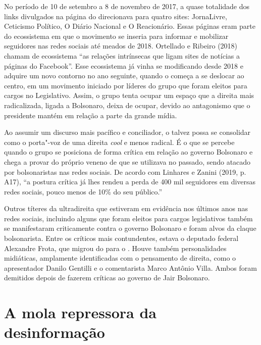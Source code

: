 No período de 10 de setembro a 8 de novembro de 2017, a quase totalidade
dos links divulgados na página do  direcionava para quatro sites:
JornaLivre, Ceticismo Político, O Diário Nacional e O Reacionário. Essas
páginas eram parte do ecossistema em que o movimento se inseria para
informar e mobilizar seguidores nas redes sociais até meados de 2018.
Ortellado e Ribeiro (2018) chamam de ecossistema ``as relações
intrínsecas que ligam sites de notícias a páginas do Facebook''. Esse
ecossistema já vinha se modificando desde 2018 e adquire um novo
contorno no ano seguinte, quando o  começa a se deslocar ao centro,
em um movimento iniciado por líderes do grupo que foram eleitos para
cargos no Legislativo. Assim, o grupo tenta ocupar um espaço que a
direita mais radicalizada, ligada a Bolsonaro, deixa de ocupar, devido
ao antagonismo que o presidente mantém em relação a parte da grande
mídia.

Ao assumir um discurso mais pacífico e conciliador, o  talvez possa
se consolidar como o porta"-voz de uma direita \emph{cool} e menos
radical. É o que se percebe quando o grupo se posiciona de forma crítica
em relação ao governo Bolsonaro e chega a provar do próprio veneno de
que se utilizava no passado, sendo atacado por bolsonaristas nas redes
sociais. De acordo com Linhares e Zanini (2019, p. A17), ``a postura
crítica já lhes rendeu a perda de 400 mil seguidores em diversas redes
sociais, pouco menos de 10\% do seu público.''

Outros títeres da ultradireita que estiveram em evidência nos últimos
anos nas redes sociais, incluindo alguns que foram eleitos para cargos
legislativos também se manifestaram criticamente contra o governo
Bolsonaro e foram alvos da claque bolsonarista. Entre os críticos mais
contundentes, estava o deputado federal Alexandre Frota, que migrou do
 para o . Houve também personalidades midiáticas, amplamente
identificadas com o pensamento de direita, como o apresentador Danilo
Gentilli e o comentarista Marco Antônio Villa. Ambos foram demitidos
depois de fazerem críticas ao governo de Jair Bolsonaro.

\section{A mola repressora da desinformação}

